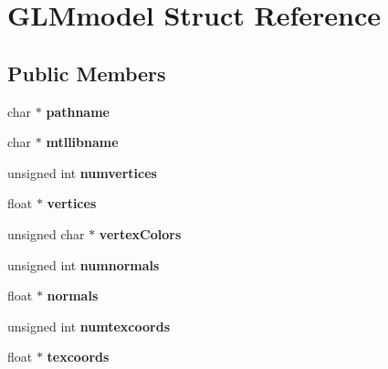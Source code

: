 \hypertarget{struct_g_l_mmodel}{}\section{G\+L\+Mmodel Struct Reference}
\label{struct_g_l_mmodel}
\subsection*{Public Members}
\begin{DoxyCompactItemize}
\item 
\mbox{\label{struct_g_l_mmodel_aad677b79122b9e369fc336534955e176}} 
char $\ast$ {\bfseries pathname}
\item 
\mbox{\label{struct_g_l_mmodel_a95915b2d61a2801e8bd8dc7051b506bf}} 
char $\ast$ {\bfseries mtllibname}
\item 
\mbox{\label{struct_g_l_mmodel_ada6322c7c36da83b1312676f3a4a191a}} 
unsigned int {\bfseries numvertices}
\item 
\mbox{\label{struct_g_l_mmodel_a14910fb121b55e7402d9c8abae765649}} 
float $\ast$ {\bfseries vertices}
\item 
\mbox{\label{struct_g_l_mmodel_aeed6c7d3320820339282bc9dea01fca2}} 
unsigned char $\ast$ {\bfseries vertex\+Colors}
\item 
\mbox{\label{struct_g_l_mmodel_a8998afb9495284f9daedb398ed2dd5ce}} 
unsigned int {\bfseries numnormals}
\item 
\mbox{\label{struct_g_l_mmodel_a349bb86baa6517ce364abb0f243f382a}} 
float $\ast$ {\bfseries normals}
\item 
\mbox{\label{struct_g_l_mmodel_ae7d1d99b7dcea9c6c1464a35dfbf8138}} 
unsigned int {\bfseries numtexcoords}
\item 
\mbox{\label{struct_g_l_mmodel_a364d6e85a2a634c848cab5b2386c01f8}} 
float $\ast$ {\bfseries texcoords}
\item 
\mbox{\label{struct_g_l_mmodel_a22da37b11de044223a29f691e9b908b7}} 

\end{DoxyCompactItemize}

